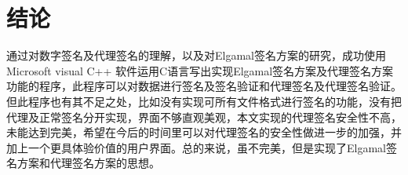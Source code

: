 \section{结论}

通过对数字签名及代理签名的理解，以及对Elgamal签名方案的研究，成功使用Microsoft visual C++ 软件运用C语言写出实现Elgamal签名方案及代理签名方案功能的程序，此程序可以对数据进行签名及签名验证和代理签名及代理签名验证。但此程序也有其不足之处，比如没有实现可所有文件格式进行签名的功能，没有把代理及正常签名分开实现，界面不够直观美观，本文实现的代理签名安全性不高，未能达到完美，希望在今后的时间里可以对代理签名的安全性做进一步的加强，并加上一个更具体验价值的用户界面。总的来说，虽不完美，但是实现了Elgamal签名方案和代理签名方案的思想。